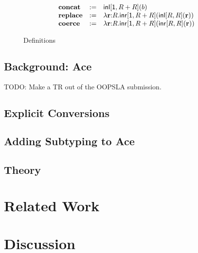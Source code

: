 \documentclass[10pt,preprint]{sigplanconf}
\theoremstyle{definition}
\begin{document}
\begin{figure}
\[
\begin{array}{lcl}
\tvar{concat} & := & \tinl{\kunit, R+R}{b}\\%
\tvar{replace} & := & \tlam{r}{R}{\tinr{\kunit, R+R}{\tinl{R,R}{\tvar{r}}}}\\%
\tvar{coerce} & := & \tlam{r}{R}{\tinr{\kunit, R+R}{\tinr{R,R}{\tvar{r}}}}\\
\end{array}
\]
\caption{Definitions}
\end{figure}

\subsection{Background: Ace}
TODO: Make a TR out of the OOPSLA submission.
\subsection{Explicit Conversions}
\subsection{Adding Subtyping to Ace}
\subsection{Theory}

\section{Related Work}

\section{Discussion}






\end{document}
